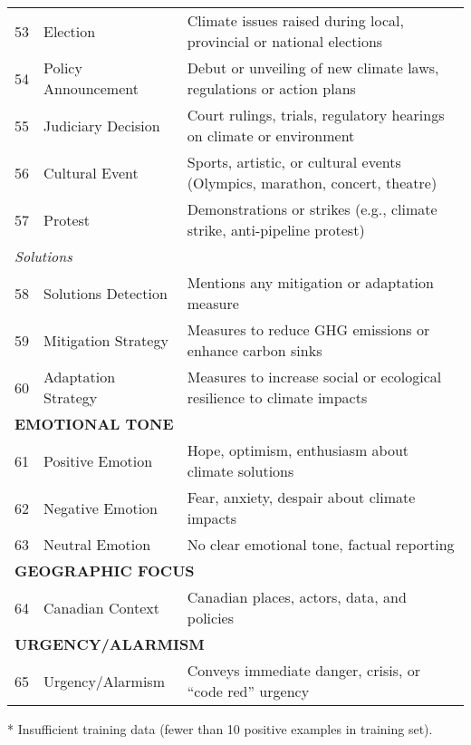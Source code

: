 \documentclass[12pt]{article}
\begin{document}
{\begin{longtable}{p{0.5cm}p{5cm}p{16cm}}
53 & Election & Climate issues raised during local, provincial or national elections \\
54 & Policy Announcement & Debut or unveiling of new climate laws, regulations or action plans \\
55 & Judiciary Decision & Court rulings, trials, regulatory hearings on climate or environment \\
56 & Cultural Event & Sports, artistic, or cultural events (Olympics, marathon, concert, theatre) \\
57 & Protest & Demonstrations or strikes (e.g., climate strike, anti-pipeline protest) \\
\midrule
\multicolumn{3}{l}{\textit{Solutions}} \\
58 & Solutions Detection & Mentions any mitigation or adaptation measure \\
59 & Mitigation Strategy & Measures to reduce GHG emissions or enhance carbon sinks \\
60 & Adaptation Strategy & Measures to increase social or ecological resilience to climate impacts \\
\midrule
\multicolumn{3}{l}{\cellcolor{gray!10}\textbf{EMOTIONAL TONE}} \\
61 & Positive Emotion & Hope, optimism, enthusiasm about climate solutions \\
62 & Negative Emotion & Fear, anxiety, despair about climate impacts \\
63 & Neutral Emotion & No clear emotional tone, factual reporting \\
\midrule
\multicolumn{3}{l}{\cellcolor{gray!10}\textbf{GEOGRAPHIC FOCUS}} \\
64 & Canadian Context & Canadian places, actors, data, and policies \\
\midrule
\multicolumn{3}{l}{\cellcolor{gray!10}\textbf{URGENCY/ALARMISM}} \\
65 & Urgency/Alarmism & Conveys immediate danger, crisis, or ``code red'' urgency \\
\bottomrule
\end{longtable}
\vspace{0.5em}
\noindent\footnotesize
* Insufficient training data (fewer than 10 positive examples in training set).
} %
\endlandscape
\landscape
\end{document}
